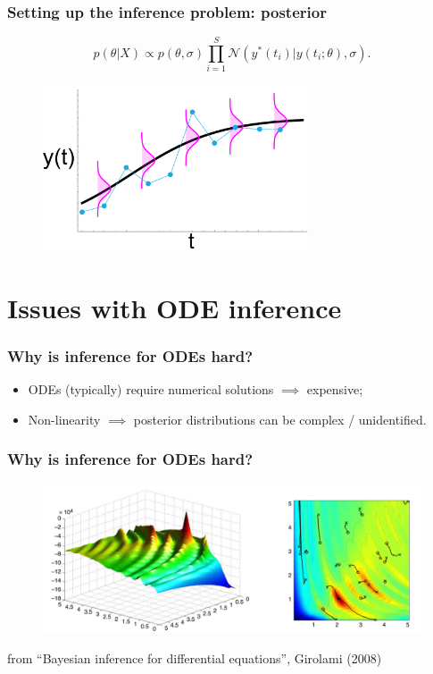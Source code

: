 \documentclass[handout]{beamer}
\begin{document}
\begin{frame}
	\frametitle{Setting up the inference problem: posterior}
	
	\begin{equation}
	p(\theta|X) \propto p(\theta,\sigma) \prod_{i=1}^{S} \mathcal{N}(y^*(t_i)| y(t_i;\theta), \sigma).
	\end{equation}
	
	\begin{figure}
		\centerline{\includegraphics[width=0.7\textwidth]{./Figures/lec7_odeSingleBulding2_data.pdf}}
	\end{figure}
	
\end{frame}

\section{Issues with ODE inference}
\frame{\tableofcontents[currentsection]}

\begin{frame}
	\frametitle{Why is inference for ODEs hard?}
	
	\begin{itemize}
		\item ODEs (typically) require numerical solutions $\implies$ expensive;
		\item Non-linearity $\implies$ posterior distributions can be complex / unidentified.
	\end{itemize}
	
\end{frame}

\begin{frame}
	\frametitle{Why is inference for ODEs hard?}
	
	\begin{figure}
		\centerline{\includegraphics[width=1\textwidth]{./Figures/girolami.png}}
	\end{figure}
	
	from ``Bayesian inference for differential equations'', Girolami (2008)
	
	
\end{frame}
\end{document}
